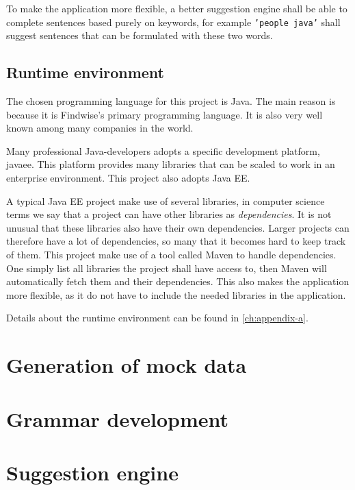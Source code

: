 To make the application more flexible, a better suggestion engine shall be able to complete sentences based purely on keywords, for example \texttt{'people java'} shall suggest sentences that can be formulated with these two words.

\subsection{Runtime environment}
The chosen programming language for this project is Java. The main reason is because it is Findwise's primary programming language. It is also very well known among many companies in the world.

Many professional Java-developers adopts a specific development platform, \ac{javaee}. This platform provides many libraries that can be scaled to work in an enterprise environment. This project also adopts Java EE.

A typical Java EE project make use of several libraries, in computer science terms we say that a project can have other libraries as \emph{dependencies}. It is not unusual that these libraries also have their own dependencies. Larger projects can therefore have a lot of dependencies, so many that it becomes hard to keep track of them. This project make use of a tool called Maven to handle dependencies. One simply list all libraries the project shall have access to, then Maven will automatically fetch them and their dependencies. This also makes the application more flexible, as it do not have to include the needed libraries in the application.


Details about the runtime environment can be found in \autoref{ch:appendix-a}.

\section{Generation of mock data}

\section{Grammar development}

\section{Suggestion engine}